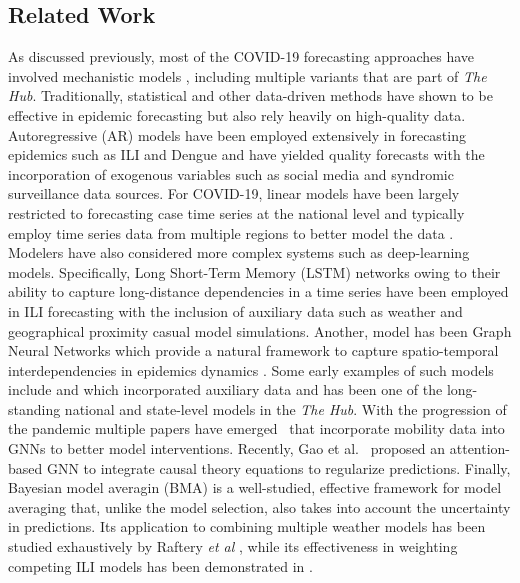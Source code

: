 \documentclass[sigconf]{acmart}
\newcommand{\hub}{\emph{The Hub}}
\begin{document}
\subsection{Related Work}
As discussed previously, most of the COVID-19 forecasting approaches have involved mechanistic models \cite{anastassopoulou2020data,chinazzi2020effect}, including multiple variants that are part of \hub{}. Traditionally, statistical and other data-driven methods have shown to be effective in epidemic forecasting but also rely heavily on high-quality data. Autoregressive (AR) models have been employed extensively in forecasting epidemics such as ILI and Dengue \cite{yang2015accurate,paul2014twitter,wang2015dynamic, prashant2019PLOSCompBio, soebiyanto2010modeling} and have yielded quality forecasts with the incorporation of exogenous variables such as social media and syndromic surveillance data sources. For COVID-19, linear models have been largely restricted to forecasting case time series at the national level and typically employ time series data from multiple regions to better model the data \cite{ARhernandez2020forecasting, ARceylan2020estimation, ARkufel2020arima}. Modelers have also considered more complex systems such as deep-learning models. Specifically, Long Short-Term Memory (LSTM) networks owing to their ability to capture long-distance dependencies in a time series have been employed in ILI forecasting \cite{volkova2017forecasting, venna2019novel,wang2019defsi} with the inclusion of auxiliary data such as weather and geographical proximity casual model simulations. Another, model has been Graph Neural Networks which provide a natural framework to capture spatio-temporal interdependencies in epidemics dynamics \cite{wu2018deep,deng2020cola}. Some early examples of such models include \cite{ramchandani2020deepcovidnet} and \cite{rodriguez2020deepcovid} which incorporated auxiliary data and has been one of the long-standing national and state-level models in the \hub{}. With the progression of the pandemic multiple papers have emerged~\cite{kapoor2020examining,fritz2021combining} that incorporate mobility data into GNNs to better model interventions. Recently, Gao et al.~\cite{gao2020stan} proposed an attention-based GNN to integrate causal theory equations to regularize predictions. Finally, Bayesian model averagin (BMA) is a well-studied, effective framework for model averaging that, unlike the model selection, also takes into account the uncertainty in predictions. Its application to combining multiple weather models has been studied exhaustively by Raftery \emph{et al} \cite{raftery2005using,raftery2003discussion}, while its effectiveness in weighting competing ILI models has been demonstrated in \cite{yamana2017individual,yamana2016superensemble}. 
\end{document}
